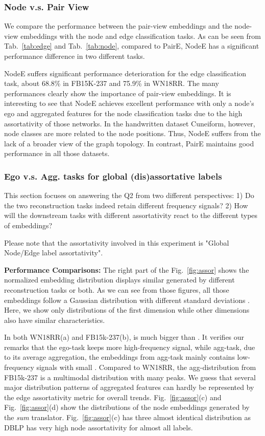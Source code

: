 \documentclass[10pt,journal,compsoc]{IEEEtran}
\begin{document}
\subsubsection{Node v.s. Pair View}
We compare the performance between the pair-view embeddings and the node-view embeddings with the node and edge classification tasks. As can be seen from Tab.~\ref{tab:edge} and Tab.~\ref{tab:node}, compared to  PairE, NodeE has a significant performance difference in two different tasks. 

NodeE suffers significant performance deterioration for the edge classification task, about 68.8\% in FB15K-237 and 75.9\% in WN18RR. The many performances clearly show the importance of pair-view embeddings. It is interesting to see that NodeE achieves excellent performance with only a node's ego and aggregated features for the node classification tasks due to the high assortativity of those networks. In the handwritten dataset Cuneiform, however, node classes are more related to the node positions. Thus, NodeE suffers from the lack of a broader view of the graph topology. In contrast, PairE maintains good performance in all those datasets.

\subsubsection {Ego v.s. Agg. tasks for global (dis)assortative labels}

This section focuses on answering the Q2 from two different perspectives: 1) Do the two reconstruction tasks indeed retain different frequency signals?  2) How will the downstream tasks with different assortativity react to the different types of embeddings?


Please note that the assortativity involved in this experiment is "Global Node/Edge label assortativity".

\noindent\textbf{Performance Comparisons:} The right part of the Fig.~\ref{fig:assor} shows the normalized embedding distribution displays similar generated by different reconstruction tasks or both. As we can see from those figures, all those embeddings follow a Gaussian distribution with different standard deviations . Here, we show only distributions of the first dimension while other dimensions also have similar characteristics. 

In both WN18RR(a) and FB15k-237(b),  is much bigger than . It verifies our remarks that the ego-task keeps more high-frequency signal, while agg-task, due to its average aggregation, the embeddings from agg-task mainly contains low-frequency signals with small . Compared to WN18RR, the agg-distribution from FB15k-237 is a multimodal distribution with many peaks. We guess that several major distribution patterns of aggregated features can hardly be represented by the edge assortativity metric for overall trends. Fig.~\ref{fig:assor}(c) and Fig.~\ref{fig:assor}(d) show the distributions of the node embeddings generated by the \textit{sum} translator. Fig.~\ref{fig:assor}(c) has three almost identical distribution as DBLP has very high node assortativity for almost all labels. 
\end{document}
